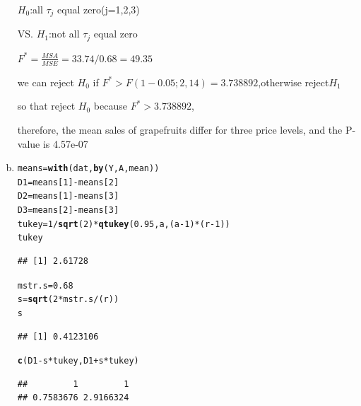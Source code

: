 \documentclass{article}\usepackage[]{graphicx}\usepackage[]{color}
\makeatletter
\newcommand{\hlnum}[1]{\textcolor[rgb]{0.686,0.059,0.569}{#1}}%
\newcommand{\hlopt}[1]{\textcolor[rgb]{0,0,0}{#1}}%
\newcommand{\hlstd}[1]{\textcolor[rgb]{0.345,0.345,0.345}{#1}}%
\newcommand{\hlkwb}[1]{\textcolor[rgb]{0.69,0.353,0.396}{#1}}%
\newcommand{\hlkwd}[1]{\textcolor[rgb]{0.737,0.353,0.396}{\textbf{#1}}}%
\newenvironment{kframe}{%
 \def\at@end@of@kframe{}%
 \ifinner\ifhmode%
  \def\at@end@of@kframe{\end{minipage}}%
  \begin{minipage}{\columnwidth}%
 \fi\fi%
 \def\FrameCommand##1{\hskip\@totalleftmargin \hskip-\fboxsep
 \colorbox{shadecolor}{##1}\hskip-\fboxsep
     \hskip-\linewidth \hskip-\@totalleftmargin \hskip\columnwidth}%
 \MakeFramed {\advance\hsize-\width
   \@totalleftmargin\z@ \linewidth\hsize
   \@setminipage}}%
 {\par\unskip\endMakeFramed%
 \at@end@of@kframe}
\newenvironment{knitrout}{}{} %
\makeatother
\begin{document}
\begin{enumerate}[(a)]
\begin{center}
$H_0$:all $\tau_j$ equal zero(j=1,2,3)

VS. $H_1$:not all $\tau_j$ equal zero

$F^*=\frac{MSA}{MSE} = 33.74/0.68   = 49.35$

we can reject $H_0$ if $F^* > F(1-0.05;2,14)=3.738892$,otherwise reject$H_1$

so that reject $H_0$ because $F^*>3.738892$,

therefore, the mean sales of grapefruits differ for three price levels, and the P-value is 4.57e-07
\end{center}

\item

\begin{knitrout}
\color{fgcolor}\begin{kframe}
\begin{alltt}
  \hlstd{means} \hlkwb{=} \hlkwd{with}\hlstd{(dat,} \hlkwd{by}\hlstd{(Y, A, mean))}
  \hlstd{D1} \hlkwb{=} \hlstd{means[}\hlnum{1}\hlstd{]} \hlopt{-} \hlstd{means[}\hlnum{2}\hlstd{]}
  \hlstd{D2} \hlkwb{=} \hlstd{means[}\hlnum{1}\hlstd{]} \hlopt{-} \hlstd{means[}\hlnum{3}\hlstd{]}
  \hlstd{D3} \hlkwb{=} \hlstd{means[}\hlnum{2}\hlstd{]} \hlopt{-} \hlstd{means[}\hlnum{3}\hlstd{]}
  \hlstd{tukey} \hlkwb{=} \hlnum{1}\hlopt{/}\hlkwd{sqrt}\hlstd{(}\hlnum{2}\hlstd{)}\hlopt{*}\hlkwd{qtukey}\hlstd{(}\hlnum{0.95}\hlstd{, a, (a}\hlopt{-}\hlnum{1}\hlstd{)}\hlopt{*}\hlstd{(r}\hlopt{-}\hlnum{1}\hlstd{))}
  \hlstd{tukey}
\end{alltt}
\begin{verbatim}
## [1] 2.61728
\end{verbatim}
\begin{alltt}
  \hlstd{mstr.s} \hlkwb{=} \hlnum{0.68}
  \hlstd{s} \hlkwb{=} \hlkwd{sqrt}\hlstd{(}\hlnum{2}\hlopt{*}\hlstd{mstr.s}\hlopt{/}\hlstd{(r))}
  \hlstd{s}
\end{alltt}
\begin{verbatim}
## [1] 0.4123106
\end{verbatim}
\begin{alltt}
  \hlkwd{c}\hlstd{(D1}\hlopt{-}\hlstd{s}\hlopt{*}\hlstd{tukey, D1}\hlopt{+}\hlstd{s}\hlopt{*}\hlstd{tukey)}
\end{alltt}
\begin{verbatim}
##         1         1 
## 0.7583676 2.9166324
\end{verbatim}
\begin{alltt}

\end{alltt}
\end{kframe}
\end{knitrout}
\end{enumerate}
\end{document}
